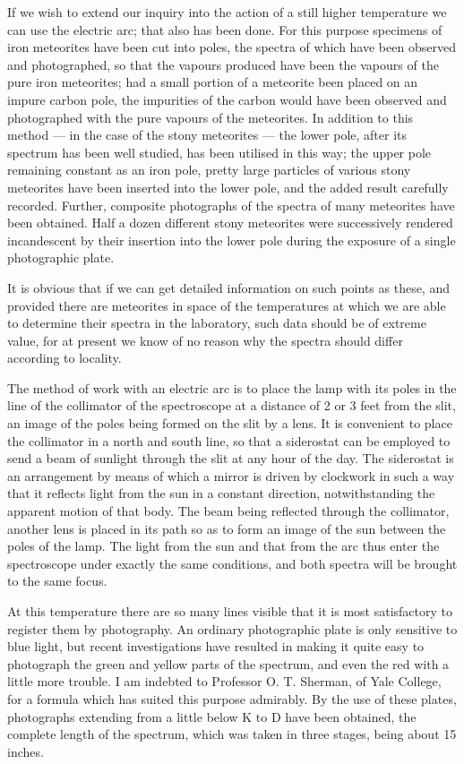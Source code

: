\documentclass[a4paper, 12pt, oneside, polutonikogreek, english]{article}
\begin{document}
If we wish to extend our inquiry into the action of a still higher temperature we can use the electric arc; that also has been done. For this purpose specimens of iron meteorites have been cut into poles, the spectra of which have been observed and photographed, so that the vapours produced have been the vapours of the pure iron meteorites; had a small portion of a meteorite been placed on an impure carbon pole, the impurities of the carbon would have been observed and photographed with the pure vapours of the meteorites. In addition to this method --- in the case of the stony meteorites --- the lower pole, after its spectrum has been well studied, has been utilised in this way; the upper pole remaining constant as an iron pole, pretty large particles of various stony meteorites have been inserted into the lower pole, and the added result carefully recorded. Further, composite photographs of the spectra of many meteorites have been obtained. Half a dozen different stony meteorites were successively rendered incandescent by their insertion into the lower pole during the exposure of a single photographic plate.

It is obvious that if we can get detailed information on such points as these, and provided there are meteorites in space of the temperatures at which we are able to determine their spectra in the laboratory, such data should be of extreme value, for at present we know of no reason why the spectra should differ according to locality.

The method of work with an electric arc is to place the lamp with its poles in the line of the collimator of the spectroscope at a distance of 2 or 3 feet from the slit, an image of the poles being formed on the slit by a lens. It is convenient to place the collimator in a north and south line, so that a siderostat can be employed to send a beam of sunlight through the slit at any hour of the day. The siderostat is an arrangement by means of which a mirror is driven by clockwork in such a way that it reflects light from the sun in a constant direction, notwithstanding the apparent motion of that body. The beam being reflected through the collimator, another lens is placed in its path so as to form an image of the sun between the poles of the lamp. The light from the sun and that from the arc thus enter the spectroscope under exactly the same conditions, and both spectra will be brought to the same focus.

At this temperature there are so many lines visible that it is most satisfactory to register them by photography. An ordinary photographic plate is only sensitive to blue light, but recent investigations have resulted in making it quite easy to photograph the green and yellow parts of the spectrum, and even the red with a little more trouble. I am indebted to Professor O. T. Sherman, of Yale College, for a formula which has suited this purpose admirably. By the use of these plates, photographs extending from a little below K to D have been obtained, the complete length of the spectrum, which was taken in three stages, being about 15 inches.
\end{document}
